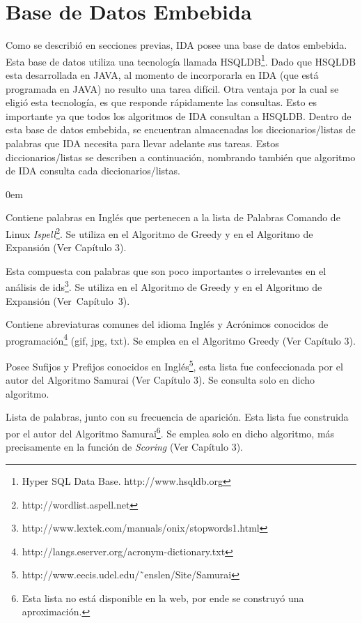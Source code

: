 \section{Base de Datos Embebida}
\label{sec:bseEmb}

Como se describió en secciones previas, IDA posee una base de datos embebida. Esta base de datos utiliza una tecnología llamada HSQLDB\footnote[1]{Hyper SQL Data Base. http://www.hsqldb.org}. Dado que HSQLDB esta desarrollada en JAVA, al momento de incorporarla en IDA (que está programada en JAVA) no resulto una tarea difícil.
Otra ventaja por la cual se eligió esta tecnología, es que responde rápidamente las consultas. Esto es importante ya que todos los algoritmos de IDA consultan a HSQLDB. Dentro de esta base de datos embebida, se encuentran almacenadas los diccionarios/listas de palabras que IDA necesita para llevar adelante sus tareas. Estos diccionarios/listas se describen a continuación, nombrando también que algoritmo de IDA consulta cada diccionarios/listas.

\begin{description}
\itemsep0em%

\item[Diccionario en Inglés (ispell):] Contiene palabras en Inglés que pertenecen a la lista de Palabras Comando de Linux \textit{Ispell}\footnote[2]{ http://wordlist.aspell.net}. Se utiliza en el Algoritmo de Greedy y en el Algoritmo de Expansión (Ver Capítulo 3).

\item[Lista de Palabras Excluyentes (stop-list):] Esta compuesta con palabras que son poco importantes o irrelevantes en el análisis de ids\footnote[3]{ http://www.lextek.com/manuals/onix/stopwords1.html}. Se utiliza en el Algoritmo de Greedy y en el Algoritmo de Expansión \mbox{(Ver Capítulo 3)}.

\item[Lista de Abreviaturas y Acrónimos Conocidas:] Contiene abreviaturas comunes del idioma Inglés y Acrónimos conocidos de programación\footnote[4]{http://langs.eserver.org/acronym-dictionary.txt} (gif, jpg, txt). Se emplea en el Algoritmo Greedy (Ver Capítulo 3).
\pagebreak
\item[Lista de Prefijos y Sufijos Conocidos:] Posee Sufijos y Prefijos conocidos en Inglés\footnote[1]{http://www.eecis.udel.edu/˜enslen/Site/Samurai}, esta lista fue confeccionada por el autor del Algoritmo Samurai (Ver Capítulo 3). Se consulta solo en dicho algoritmo.

\item[Frecuencias Globales de Palabras:] Lista de palabras, junto con su frecuencia de aparición. Esta lista fue construida por el autor del Algoritmo Samurai\footnote[2]{Esta lista no está disponible en la web, por ende se construyó una aproximación.}. Se emplea solo en dicho algoritmo, más precisamente en la función de \textit{Scoring} (Ver Capítulo 3).

\end{description}

